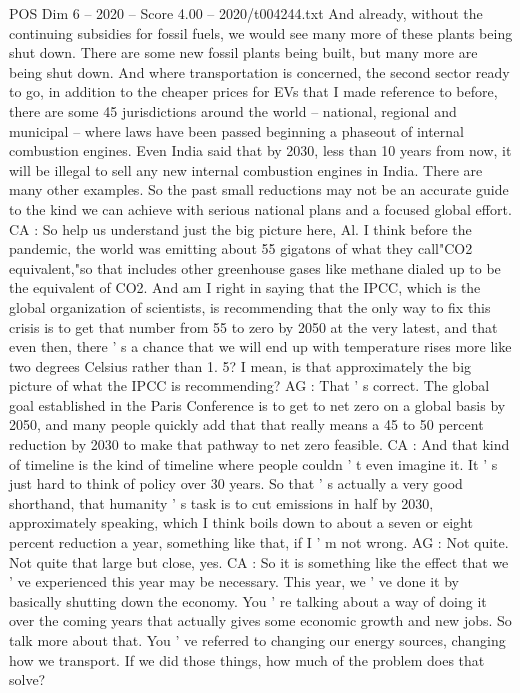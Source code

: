 \begin{textsample}{POS Dim 6 – 2020 – Score 4.00 – 2020/t004244.txt}
And already, without the continuing subsidies for fossil fuels, we would see many more of these plants being shut down.
There are some new fossil plants being built, but many more are being shut down.
And where transportation is concerned, the second sector ready to go, in addition to the cheaper prices for EVs that I made reference to before, there are some 45 jurisdictions around the world -- national, regional and municipal -- where laws have been passed beginning a phaseout of internal combustion engines.
Even India said that by 2030, less than 10 years from now, it will be illegal to sell any new internal combustion engines in India.
There are many other examples.
So the past small reductions may not be an accurate guide to the kind we can achieve with serious national plans and a focused global effort.
CA : So help us understand just the big picture here, Al.
I think before the pandemic, the world was emitting about 55 gigatons of what they call"CO2 equivalent,"so that includes other greenhouse gases like methane dialed up to be the equivalent of CO2.
And am I right in saying that the IPCC, which is the global organization of scientists, is recommending that the only way to fix this crisis is to get that number from 55 to zero by 2050 at the very latest, and that even then, there ' s a chance that we will end up with temperature rises more like two degrees Celsius rather than 1. 5?
I mean, is that approximately the big picture of what the IPCC is recommending?
AG : That ' s correct.
The global goal established in the Paris Conference is to get to net zero on a global basis by 2050, and many people quickly add that that really means a 45 to 50 percent reduction by 2030 to make that pathway to net zero feasible.
CA : And that kind of timeline is the kind of timeline where people couldn ' t even imagine it.
It ' s just hard to think of policy over 30 years.
So that ' s actually a very good shorthand, that humanity ' s task is to cut emissions in half by 2030, approximately speaking, which I think boils down to about a seven or eight percent reduction a year, something like that, if I ' m not wrong.
AG : Not quite.
Not quite that large but close, yes.
CA : So it is something like the effect that we ' ve experienced this year may be necessary.
This year, we ' ve done it by basically shutting down the economy.
You ' re talking about a way of doing it over the coming years that actually gives some economic growth and new jobs.
So talk more about that.
You ' ve referred to changing our energy sources, changing how we transport.
If we did those things, how much of the problem does that solve?

\end{textsample}
